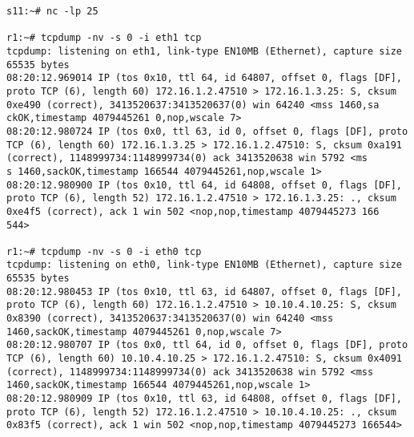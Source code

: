 \documentclass[a4paper,12pt]{article}
\begin{document}
\begin{Verbatim}
s11:~# nc -lp 25

r1:~# tcpdump -nv -s 0 -i eth1 tcp
tcpdump: listening on eth1, link-type EN10MB (Ethernet), capture size 65535 bytes
08:20:12.969014 IP (tos 0x10, ttl 64, id 64807, offset 0, flags [DF], proto TCP (6), length 60) 172.16.1.2.47510 > 172.16.1.3.25: S, cksum 0xe490 (correct), 3413520637:3413520637(0) win 64240 <mss 1460,sa
ckOK,timestamp 4079445261 0,nop,wscale 7>
08:20:12.980724 IP (tos 0x0, ttl 63, id 0, offset 0, flags [DF], proto TCP (6), length 60) 172.16.1.3.25 > 172.16.1.2.47510: S, cksum 0xa191 (correct), 1148999734:1148999734(0) ack 3413520638 win 5792 <ms
s 1460,sackOK,timestamp 166544 4079445261,nop,wscale 1>
08:20:12.980900 IP (tos 0x10, ttl 64, id 64808, offset 0, flags [DF], proto TCP (6), length 52) 172.16.1.2.47510 > 172.16.1.3.25: ., cksum 0xe4f5 (correct), ack 1 win 502 <nop,nop,timestamp 4079445273 166
544>

r1:~# tcpdump -nv -s 0 -i eth0 tcp
tcpdump: listening on eth0, link-type EN10MB (Ethernet), capture size 65535 bytes
08:20:12.980453 IP (tos 0x10, ttl 63, id 64807, offset 0, flags [DF], proto TCP (6), length 60) 172.16.1.2.47510 > 10.10.4.10.25: S, cksum 0x8390 (correct), 3413520637:3413520637(0) win 64240 <mss 1460,sackOK,timestamp 4079445261 0,nop,wscale 7>
08:20:12.980707 IP (tos 0x0, ttl 64, id 0, offset 0, flags [DF], proto TCP (6), length 60) 10.10.4.10.25 > 172.16.1.2.47510: S, cksum 0x4091 (correct), 1148999734:1148999734(0) ack 3413520638 win 5792 <mss 1460,sackOK,timestamp 166544 4079445261,nop,wscale 1>
08:20:12.980909 IP (tos 0x10, ttl 63, id 64808, offset 0, flags [DF], proto TCP (6), length 52) 172.16.1.2.47510 > 10.10.4.10.25: ., cksum 0x83f5 (correct), ack 1 win 502 <nop,nop,timestamp 4079445273 166544>
\end{Verbatim}
\end{document}
